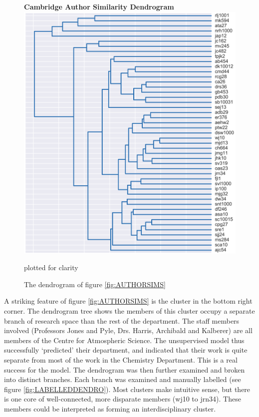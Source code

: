 \begin{center}
\begin{figure}[H]
  \centering
  \textbf{Cambridge Author Similarity Dendrogram}
    \includegraphics[width=\textwidth]{Analysis/dendro.png}
    \caption[Cambridge Author Similarity Dendrogram]{The dendrogram of figure \ref{fig:AUTHORSIMS}} plotted for clarity
\end{figure} 
\label{fig:DENDRO}

\end{center}
A striking feature of figure \ref{fig:AUTHORSIMS} is the cluster in the bottom right corner. The dendrogram tree shows the members of this cluster occupy a separate branch of research space than the rest of the department. The staff members involved (Professors Jones and Pyle, Drs. Harris, Archibald and Kalberer) are all members of the Centre for Atmospheric Science. The unsupervised model thus successfully `predicted' their department, and indicated that their work is quite separate from most of the work in the Chemistry Department. This is a real success for the model. The dendrogram was then further examined and broken into distinct branches. Each branch was examined and manually labelled (see figure \ref{fig:LABELLEDDENDRO}). Most clusters make intuitive sense, but there is one core of well-connected, more disparate members (wj10 to jrn34). These members could be interpreted as forming an interdisciplinary cluster.  
